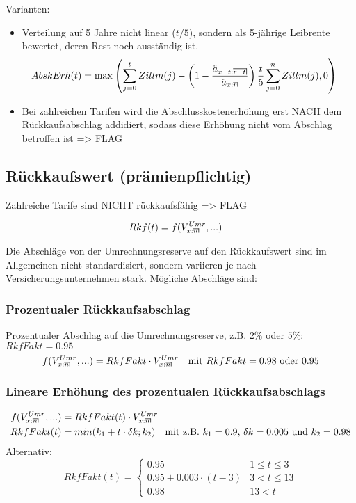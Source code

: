 \documentclass[a4paper,10pt]{article}
\makeatletter
\newcommand{\xn}{{\act[x]{n}}}
\DeclareRobustCommand{\act}[2][]{%
\def\arraystretch{0}%
\setlength\arraycolsep{0.5pt}%
\setlength\arrayrulewidth{0.5pt}%
\setbox0=\hbox{$\scriptstyle#1\ifx#1\empty{asdf}\else:\fi#2$}%
\begin{array}[b]{*2{@{}>{\scriptstyle}c}|}
\cline{2-2}%
\rule[1.25pt]{0pt}{\ht0}%
#1\ifx#1\empty\else:\fi & #2%
\end{array}%
}
\makeatother
\begin{document}
Varianten:
\begin{itemize}
 \item Verteilung auf 5 Jahre nicht linear ($t/5$), sondern als 5-jährige Leibrente bewertet, deren Rest noch ausständig ist.
 \begin{align*}
   AbskErh(t) &= \max\left(\sum_{j=0}^t Zillm(j) - \left(1-\frac{\ddot{a}_{\act[x+t]{r-t}}}{\ddot{a}_{\act[x]{r}}}\right) \frac{t}{5} \sum_{j=0}^n Zillm(j), 0\right)
 \end{align*}
 \item Bei zahlreichen Tarifen wird die Abschlusskostenerhöhung erst NACH dem Rückkaufsabschlag addidiert,
    sodass diese Erhöhung nicht vom Abschlag betroffen ist => FLAG
\end{itemize}

\subsection{Rückkaufswert (prämienpflichtig)}

Zahlreiche Tarife sind NICHT rückkaufsfähig => FLAG

\begin{align*}
 Rkf(t) &= f(V_\xn^{Umr}, ...)
\end{align*}

Die Abschläge von der Umrechnungsreserve auf den Rückkaufswert sind im Allgemeinen nicht
standardisiert, sondern variieren je nach Versicherungsunternehmen stark. Mögliche
Abschläge sind:

\subsubsection*{Prozentualer Rückkaufsabschlag}
Prozentualer Abschlag auf die Umrechnungsreserve, z.B. $2\%$ oder $5\%$:
$RkfFakt=0.95$
\begin{align*}
f(V_\xn^{Umr}, ...) = RkfFakt \cdot V_\xn^{Umr} \text{\quad mit $RkfFakt=0.98$ oder $0.95$}
\end{align*}

\subsubsection*{Lineare Erhöhung des prozentualen Rückkaufsabschlags}
\begin{align*}
f(V_\xn^{Umr}, ...) &= RkfFakt(t) \cdot V_\xn^{Umr} \\
RkfFakt(t) &= min(k_1 + t \cdot \delta k; k_2) \text{\quad mit z.B. $k_1=0.9$, $\delta k = 0.005$ und $k_2=0.98$}
\end{align*}
Alternativ:
\begin{equation*}%
 RkfFakt(t) = \begin{cases}
0.95 & 1\leq t \leq 3\\
0.95 + 0.003\cdot(t-3) & 3<t\leq 13\\
0.98 & 13<t
\end{cases}
\end{equation*}
\end{document}
